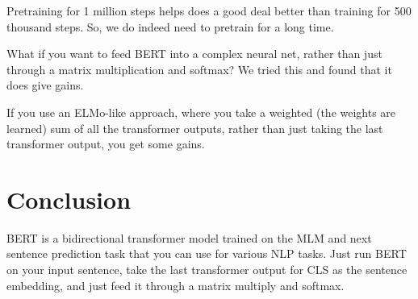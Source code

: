 \documentclass[a4paper]{article}
\begin{document}
Pretraining for 1 million steps helps does a good deal better than training
for 500 thousand steps. So, we do indeed need to pretrain for a long time.

What if you want to feed BERT into a complex neural net, rather than just
through a matrix multiplication and softmax? We tried this and found that it
does give gains.

If you use an ELMo-like approach, where you take a weighted (the weights
are learned) sum of all the transformer outputs, rather than just taking
the last transformer output, you get some gains.

\section{Conclusion}
BERT is a bidirectional transformer model trained on the MLM and next sentence
prediction task that you can use for various NLP tasks. Just run BERT on your
input sentence, take the last transformer output for CLS as the sentence embedding,
and just feed it through a matrix multiply and softmax.
\end{document}
